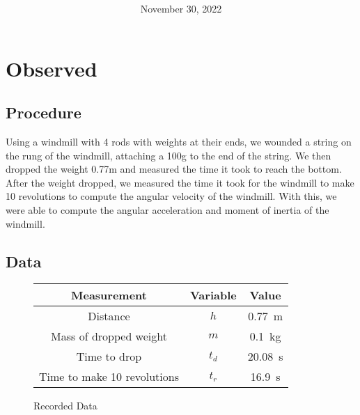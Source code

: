 \documentclass[article, 11pt]{article}
\title{
    \vspace{2in}
    \textmd{\textbf{\labTitle}}
    \normalsize\vspace{0.1in}\\
    \vspace{0.1in}\large{\text{\class: \professor}}
    \vspace{3in}
}
\author{\name}
\date{November 30, 2022}
\begin{document}
    \maketitle
    \thispagestyle{empty}
    \pagebreak
    
    \section{Observed}
    \subsection{Procedure}
    \noindent 
    Using a windmill with 4 rods with weights at their ends, we wounded a string on the rung of the windmill, attaching a 100g to the end of the string. We then dropped the weight 0.77m and measured the time it took to reach the bottom. After the weight dropped, we measured the time it took for the windmill to make 10 revolutions to compute the angular velocity of the windmill. With this, we were able to compute the angular acceleration and moment of inertia of the windmill.

    \subsection{Data}
    \begin{figure}[H]
        \begin{center}
            \begin{tabular}{|c|c|c|}
                \hline
                \textbf{Measurement} & \textbf{Variable} & \textbf{Value} \\
                \hline
                Distance & $h$ & \SI{0.77}{\meter} \\
                Mass of dropped weight & $m$ & \SI{0.1}{\kilogram} \\
                Time to drop & $t_d$ & \SI{20.08}{\second} \\
                Time to make 10 revolutions & $t_r$ & \SI{16.9}{\second} \\
                \hline
            \end{tabular}
        \end{center}
        \caption{Recorded Data}
    \end{figure}
\end{document}

